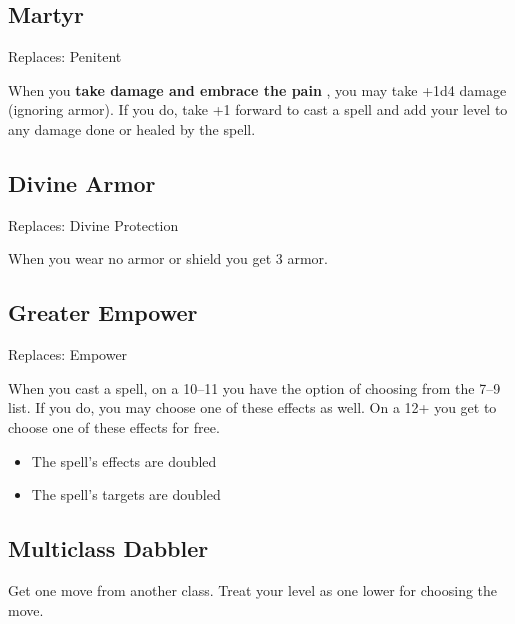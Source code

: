 \subsection{Martyr}


 Replaces: Penitent


 When you \textbf{take damage and embrace the pain}
, you may take +1d4 damage (ignoring armor). If you do, take +1 forward to cast a spell and add your level to any damage done or healed by the spell.
\subsection{Divine Armor}


 Replaces: Divine Protection


 When you wear no armor or shield you get 3 armor.
\subsection{Greater Empower}


 Replaces: Empower


 When you cast a spell, on a 10--11 you have the option of choosing from the 7--9 list. If you do, you may choose one of these effects as well. On a 12+ you get to choose one of these effects for free.
\begin{itemize}
\item The spell's effects are doubled
\item The spell's targets are doubled

\end{itemize}
\subsection{Multiclass Dabbler}


 Get one move from another class. Treat your level as one lower for choosing the move.



